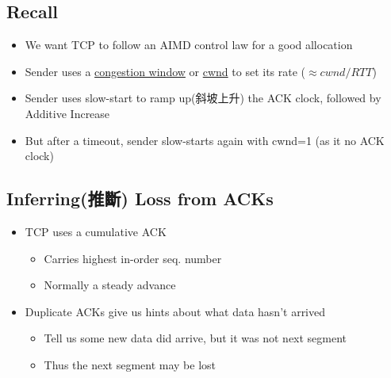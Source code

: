 \documentclass[12pt]{ctexart}   %
\begin{document}
	\subsection{Recall}
	\begin{itemize}
		\item We want TCP to follow an AIMD control law for a good allocation
		\item Sender uses a \underline{congestion window} or \underline{cwnd} to set its rate ($\approx cwnd/RTT$)
		\item Sender uses slow-start to ramp up(斜坡上升) the ACK clock, followed by Additive Increase
		\item But after a timeout, sender slow-starts again with cwnd=1 (as it no ACK clock)
	\end{itemize}
	
	\subsection{Inferring(推斷) Loss from ACKs}
	\begin{itemize}
		\item TCP uses a cumulative ACK
		\begin{itemize}
			\item Carries highest in-order seq. number
			\item Normally a steady advance
		\end{itemize}
		
		\item Duplicate ACKs give us hints about what data hasn't arrived
		\begin{itemize}
			\item Tell us some new data did arrive, but it was not next segment
			\item Thus the next segment may be lost
		\end{itemize}
	\end{itemize}
	
\end{document}
